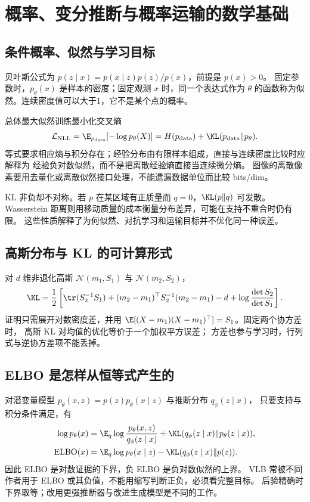 \chapter{概率、变分推断与概率运输的数学基础}
\label{th:probability}

\section{条件概率、似然与学习目标}

贝叶斯公式为 $p(z\mid x)=p(x\mid z)p(z)/p(x)$，前提是 $p(x)>0$。
固定参数时，$p_\theta(x)$ 是样本的密度；固定观测 $x$ 时，同一个表达式作为
$\theta$ 的函数称为似然。连续密度值可以大于1，它不是某个点的概率。

总体最大似然训练最小化交叉熵
\[
\mathcal L_{\rm NLL}=\E_{p_{\rm data}}[-\log p_\theta(X)]
=H(p_{\rm data})+\KL(p_{\rm data}\Vert p_\theta).
\]
等式要求相应熵与积分存在；经验分布由有限样本组成，直接与连续密度比较时应解释为
经验负对数似然，而不是把离散经验熵直接当连续微分熵。
图像的离散像素要用去量化或离散似然接口处理，不能遗漏数据单位而比较 bits/dim。

KL 非负却不对称。若 $p$ 在某区域有正质量而 $q=0$，$\KL(p\Vert q)$ 可发散。
Wasserstein 距离则用移动质量的成本衡量分布差异，可能在支持不重合时仍有限。
这些性质解释了为何似然、对抗学习和运输目标并不优化同一种误差。

\section{高斯分布与 KL 的可计算形式}

对 $d$ 维非退化高斯 $\mathcal N(m_1,S_1)$ 与 $\mathcal N(m_2,S_2)$，
\begin{equation}\label{th:gaussian-kl}
\KL=\frac12\left[\tr(S_2^{-1}S_1)
 +(m_2-m_1)^\top S_2^{-1}(m_2-m_1)-d
 +\log\frac{\det S_2}{\det S_1}\right].
\end{equation}
证明只需展开对数密度差，并用
$\E[(X-m_1)(X-m_1)^\top]=S_1$。固定两个协方差时，
高斯 KL 对均值的优化等价于一个加权平方误差；
方差也参与学习时，行列式与逆协方差项不能丢掉。

\section{ELBO 是怎样从恒等式产生的}

对潜变量模型 $p_\theta(x,z)=p(z)p_\theta(x\mid z)$ 与推断分布 $q_\phi(z\mid x)$，
只要支持与积分条件满足，有
\begin{align}
\log p_\theta(x)
&=\E_q\log\frac{p_\theta(x,z)}{q_\phi(z\mid x)}
 +\KL(q_\phi(z\mid x)\Vert p_\theta(z\mid x)),\\
\mathrm{ELBO}(x)
&=\E_q\log p_\theta(x\mid z)-\KL(q_\phi(z\mid x)\Vert p(z)).
\end{align}
因此 ELBO 是对数证据的下界，负 ELBO 是负对数似然的上界。
VLB 常被不同作者用于 ELBO 或其负值，不能用缩写判断正负，必须看完整目标。
后验精确时下界取等；改用更强推断器与改进生成模型是不同的工作。

